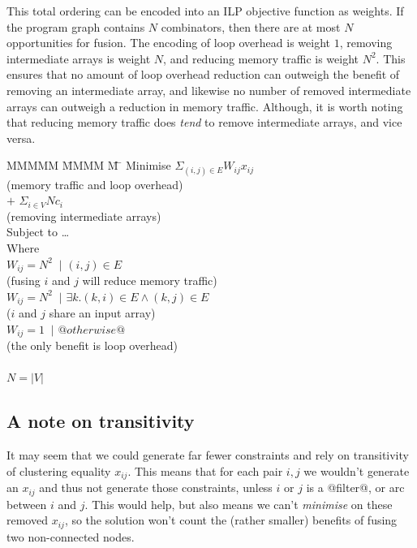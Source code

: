 This total ordering can be encoded into an ILP objective function as weights.
If the program graph contains $N$ combinators, then there are at most $N$ opportunities for fusion.
The encoding of loop overhead is weight $1$, removing intermediate arrays is weight $N$, and reducing memory traffic is weight $N^2$.
This ensures that no amount of loop overhead reduction can outweigh the benefit of removing an intermediate array,
and likewise no number of removed intermediate arrays can outweigh a reduction in memory traffic.
Although, it is worth noting that reducing memory traffic does \emph{tend} to remove intermediate arrays, and vice versa.

\begin{tabbing}
MMMMM   \= MMMM \= M \= \kill
Minimise   \>     \> $\Sigma_{(i,j) \in E} W_{ij} x_{ij}$   \\
           \> \> \> (memory traffic and loop overhead)         \\
           \> $+$ \> $\Sigma_{i \in V} N c_i$  \\
           \> \> \> (removing intermediate arrays)         \\
Subject to \> \ldots                                \\
Where      \>                                       \\
           \> $W_{ij} = N^2$ \> $~|$ \> $(i,j) \in E $         \\
           \> \> \> (fusing $i$ and $j$ will reduce memory traffic)         \\
           \> $W_{ij} = N^2$ \> $~|$ \> $\exists k. (k,i) \in E \wedge (k,j) \in E $     \\
           \> \> \> ($i$ and $j$ share an input array)                                         \\
           \> $W_{ij} = 1$   \> $~|$ \> $@otherwise@$                                                  \\
           \> \> \> (the only benefit is loop overhead)                                        \\
           \\
           \> $N = |V|$
\end{tabbing}



\subsection{A note on transitivity}
It may seem that we could generate far fewer constraints and rely on transitivity of clustering equality $x_{ij}$.
This means that for each pair $i,j$ we wouldn't generate an $x_{ij}$ and thus not generate those constraints, unless $i$ or $j$ is a @filter@, or arc between $i$ and $j$.
This would help, but also means we can't \emph{minimise} on these removed $x_{ij}$, so the solution won't count the (rather smaller) benefits of fusing two non-connected nodes.

